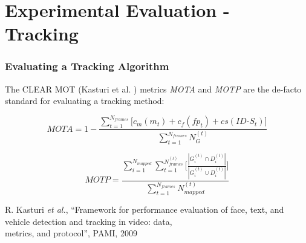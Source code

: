 \section{Experimental Evaluation - Tracking}

\begin{frame}
	\frametitle{Evaluating a Tracking Algorithm}
	
	\Large
	
	\vspace{0.45cm}
	
	The CLEAR MOT (Kasturi et al. \cite{Kasturi09}) metrics \emph{MOTA} and \emph{MOTP} are the
	de-facto standard for evaluating a tracking method:
	
	\vspace{-0.5cm}
	
	\begin{equation*}
		MOTA = 1 - \frac{\sum_{t=1}^{N_{frames}} \big [ c_m(m_t) + c_f(fp_t) + cs(ID\mbox{-}S_t) \big ]}{\sum_{t=1}^{N_{frames}} N_G^{(t)}}
	\end{equation*}
	
	\vspace{0.4cm}
	
	\begin{equation*}
		MOTP = \frac{\sum_{i=1}^{N_{mapped}} \sum_{t=1}^{N_{frames}^{(t)}} \Big [ \frac{| G_i^{(t)} \cap D_i^{(t)} |}{| G_i^{(t)} \cup D_i^{(t)} |} \Big ] }{\sum_{t=1}^{N_{frames}} N_{mapped}^{(t)}}
	\end{equation*}
	
	\vspace{0.3cm}
	
	\tiny
	
	\cite{Kasturi09} R. Kasturi \emph{et al.},  ``Framework for performance evaluation of face, text,
	and vehicle detection and tracking in video: data,\\ \hspace{0.25cm} metrics, and protocol'', PAMI,
	2009 \\
\end{frame}

